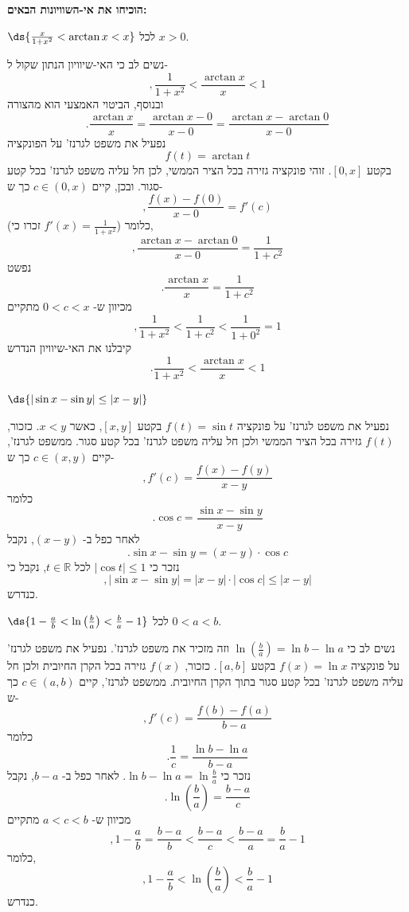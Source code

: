 \textbf{הוכיחו את אי-השוויונות הבאים:}
\bE
\item $\ds{\frac{x}{1 + x^2} < \arctan x < x}$ לכל $x > 0$.
\begin{solbox}
נשים לב כי האי-שיוויון הנתון שקול ל-
$$,\frac{1}{1+x^2}<\frac{\arctan x}{x}<1$$
ובנוסף, הביטוי האמצעי הוא מהצורה
$$.\frac{\arctan x}{x}=\frac{\arctan x-0}{x-0}=\frac{\arctan x-\arctan0}{x-0}$$
נפעיל את משפט לגרנז' על הפונקציה
$$f(t)=\arctan t$$
בקטע
$[0,x]$.
זוהי פונקציה גזירה בכל הציר הממשי, לכן חל עליה משפט לגרנז' בכל קטע סגור.
ובכן,
קיים
$c\in(0,x)$
כך ש-
$$,\frac{f(x)-f(0)}{x-0}=f'(c)$$
(זכרו כי
$f'(x)=\frac{1}{1+x^2}$)
כלומר,
$$,\frac{\arctan x-\arctan0}{x-0}=\frac{1}{1+c^2}$$
נפשט
$$.\frac{\arctan x}{x}=\frac{1}{1+c^2}$$
מכיוון ש-
$0<c<x$
מתקיים
$$,\frac{1}{1+x^2}<\frac{1}{1+c^2}<\frac{1}{1+0^2}=1$$
קיבלנו את האי-שיוויון הנדרש
$$.\frac{1}{1+x^2}<\frac{\arctan x}{x}<1$$
\end{solbox}

\item $\ds{|\sin x - \sin y| \leq |x - y|}$
\begin{solbox}
נפעיל את משפט לגרנז' על פונקציה
$f(t)=\sin t$
בקטע
$[x,y]$,
כאשר
$x<y$.
כזכור,
$f(t)$
גזירה בכל הציר הממשי ולכן חל עליה משפט לגרנז' בכל קטע סגור.
ממשפט לגרנז', קיים
$c\in(x,y)$
כך ש-
$$,f'(c)=\frac{f(x)-f(y)}{x-y}$$
כלומר
$$.\cos c=\frac{\sin x-\sin y}{x-y}$$
לאחר כפל ב-
$(x-y)$,
נקבל
$$.\sin x-\sin y=(x-y)\cdot\cos c$$
נזכר כי
$|\cos t|\leq 1$
לכל
$t\in\mathbb{R}$,
נקבל כי
$$,|\sin x-\sin y|=|x-y|\cdot|\cos c|\leq|x-y|$$
כנדרש.
\end{solbox}
\item $\ds{1-\frac{a}{b} < \ln\left(\frac{b}{a}\right) < \frac{b}{a}-1}$ לכל $0<a<b$.
\begin{solbox}
נשים לב כי
$\ln\left(\frac{b}{a}\right)=\ln b-\ln a$
וזה מזכיר את משפט לגרנז'.
נפעיל את משפט לגרנז' על פונקציה
$f(x)=\ln x$
בקטע
$[a,b]$.
כזכור,
$f(x)$
גזירה בכל הקרן החיובית ולכן חל עליה משפט לגרנז' בכל קטע סגור
בתוך הקרן החיובית.
ממשפט לגרנז', קיים
$c\in(a,b)$
כך ש-
$$,f'(c)=\frac{f(b)-f(a)}{b-a}$$
כלומר
$$.\frac{1}{c}=\frac{\ln b-\ln a}{b-a}$$
נזכר כי
$\ln b-\ln a=\ln\frac{b}{a}$.
לאחר כפל ב-
$b-a$,
נקבל
$$.\ln\left(\frac{b}{a}\right)=\frac{b-a}{c}$$
מכיוון ש-
$a<c<b$
מתקיים
$$,1-\frac{a}{b}=\frac{b-a}{b}<\frac{b-a}{c}<\frac{b-a}{a}=\frac{b}{a}-1$$
כלומר,
$$,1-\frac{a}{b}<\ln\left(\frac{b}{a}\right)<\frac{b}{a}-1$$
כנדרש.
\end{solbox}
\eE
